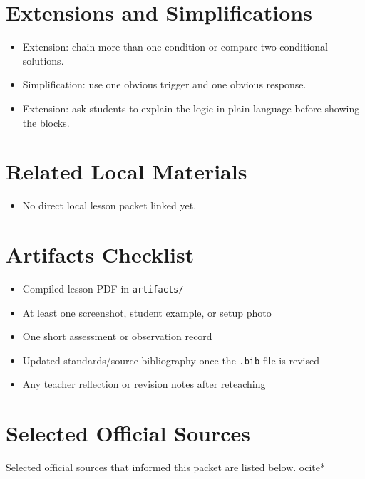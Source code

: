 \documentclass[11pt]{article}
\begin{document}
\section*{Extensions and Simplifications}
\begin{itemize}[leftmargin=*]
\item Extension: chain more than one condition or compare two conditional solutions.
\item Simplification: use one obvious trigger and one obvious response.
\item Extension: ask students to explain the logic in plain language before showing the blocks.
\end{itemize}

\section*{Related Local Materials}
\begin{itemize}[leftmargin=*]
\item No direct local lesson packet linked yet.
\end{itemize}

\section*{Artifacts Checklist}
\begin{itemize}[leftmargin=*]
\item Compiled lesson PDF in \texttt{artifacts/}
\item At least one screenshot, student example, or setup photo
\item One short assessment or observation record
\item Updated standards/source bibliography once the \texttt{.bib} file is revised
\item Any teacher reflection or revision notes after reteaching
\end{itemize}

\section*{Selected Official Sources}
Selected official sources that informed this packet are listed below.
ocite{*}



\end{document}
